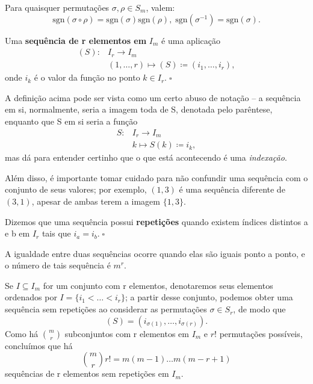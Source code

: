 \documentclass[../differential_forms.tex]{subfiles}
\begin{document}
\begin{prop*}
	Para quaisquer permutações \(\sigma, \rho \in S_{m}\), valem:
	\[
		\mathrm{sgn}(\sigma \circ \rho ) = \mathrm{sgn}(\sigma )\mathrm{sgn}(\rho ),\; \mathrm{sgn}(\sigma^{-1}) = \mathrm{sgn}(\sigma ).
	\]
\end{prop*}

\begin{def*}
	Uma \textbf{sequência de r elementos em }\(I_{m}\) é uma aplicação
	\begin{align*}
		(S): & I_{r}\rightarrow I_{m}                                     \\
		     & (1,\dotsc ,r)\longmapsto (S)\coloneqq (i_1, \dotsc , i_r),
	\end{align*}
	onde \(i_{k}\) é o valor da função no ponto \(k\in I_{r}.\; \square\)
\end{def*}
\begin{tcolorbox}[
		skin=enhanced,
		title=Observação,
		fonttitle=\bfseries,
		colframe=black,
		colbacktitle=cyan!75!white,
		colback=cyan!15,
		colbacklower=black,
		coltitle=black,
		drop fuzzy shadow,
	]
	A definição acima pode ser vista como um certo abuso de notação -- a sequência em si, normalmente, seria a imagem toda de S, denotada pelo parêntese, enquanto que S em si seria a função
	\begin{align*}
		S: & I_r\rightarrow I_{m}               \\
		   & k\longmapsto S(k) \coloneqq i_{k},
	\end{align*}
	mas dá para entender certinho que o que está acontecendo é uma \textit{indexação}.

	Além disso, é importante tomar cuidado para não confundir uma sequência com o conjunto de seus valores; por exemplo, \((1, 3)\) é uma sequência diferente de \((3, 1)\), apesar de ambas terem a imagem \(\{1, 3\}.\)
\end{tcolorbox}

\begin{def*}
	Dizemos que uma sequência possui \textbf{repetições} quando existem índices distintos a e b em \(I_r\) tais que \(i_a = i_b.\; \square\)
\end{def*}
A igualdade entre duas sequências ocorre quando elas são iguais ponto a ponto, e o número de tais sequência é \(m^{r}.\)

Se \(I\subseteq I_{m}\) for um conjunto com r elementos, denotaremos seus elementos ordenados por \(I=\{i_1 <\dotsc <i_r\}\); a partir desse conjunto, podemos obter uma sequência sem repetições ao considerar as permutações \(\sigma \in S_r\), de modo que
\[
	(S) = (i_{\sigma (1)}, \dotsc , i_{\sigma (r)}).
\]
Como há \(\binom{m}{r}\) subconjuntos com r elementos em \(I_{m}\) e \(r!\) permutações possíveis, concluímos que há
\[
	\binom{m}{r}r! = m(m-1)\dotsc m(m-r+1)
\]
sequências de r elementos sem repetições em \(I_{m}.\)
\end{document}
